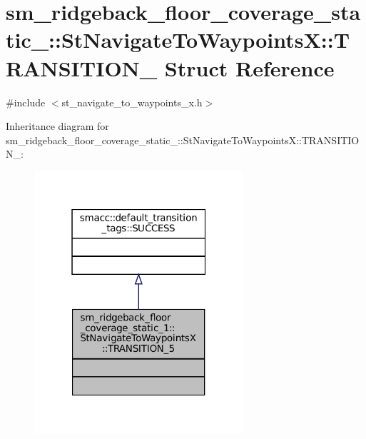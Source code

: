 \hypertarget{structsm__ridgeback__floor__coverage__static__1_1_1StNavigateToWaypointsX_1_1TRANSITION__5}{}\section{sm\+\_\+ridgeback\+\_\+floor\+\_\+coverage\+\_\+static\+\_\+:\+:St\+Navigate\+To\+WaypointsX\+:\+:T\+R\+A\+N\+S\+I\+T\+I\+O\+N\+\_ Struct Reference}
\label{structsm__ridgeback__floor__coverage__static__1_1_1StNavigateToWaypointsX_1_1TRANSITION__5}


{\ttfamily \#include $<$st\+\_\+navigate\+\_\+to\+\_\+waypoints\+\_\+x.\+h$>$}



Inheritance diagram for sm\+\_\+ridgeback\+\_\+floor\+\_\+coverage\+\_\+static\+\_\+:\+:St\+Navigate\+To\+WaypointsX\+:\+:T\+R\+A\+N\+S\+I\+T\+I\+O\+N\+\_\+:
\nopagebreak
\begin{figure}[H]
\begin{center}
\leavevmode
\includegraphics[width=220pt]{structsm__ridgeback__floor__coverage__static__1_1_1StNavigateToWaypointsX_1_1TRANSITION__5__inherit__graph}
\end{center}
\end{figure}


